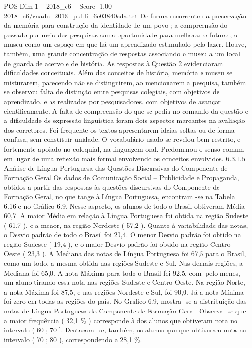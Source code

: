 \begin{textsample}{POS Dim 1 – 2018\_c6 – Score -1.00 – 2018\_c6/enade\_2018\_publi\_6e03840cda.txt}
De forma recorrente : a preservação da memória para construção da identidade de um povo ; a compreensão do passado por meio das pesquisas como oportunidade para melhorar o futuro ; o museu como um espaço em que há um aprendizado estimulado pelo lazer.
Houve, também, uma grande concentração de respostas associando o museu a um local de guarda de acervo e de história.
As respostas à Questão 2 evidenciaram dificuldades conceituais.
Além dos conceitos de história, memória e museu se misturarem, parecendo não se distinguirem, ao mencionarem a pesquisa, também se observou falta de distinção entre pesquisas colegiais, com objetivos de aprendizado, e as realizadas por pesquisadores, com objetivos de avançar cientificamente.
A falta de compreensão do que se pedia no comando da questão e a dificuldade de expressão linguística foram dois aspectos marcantes na avaliação dos corretores.
Foi frequente os textos apresentarem ideias soltas ou de forma confusa, sem constituir unidade.
O vocabulário usado se revelou bem restrito, e fortemente apoiado no coloquial, na linguagem oral.
Predominou o senso comum em lugar de uma reflexão mais formal envolvendo os conceitos envolvidos. 6.3.1.5 Análise de Língua Portuguesa das Questões Discursivas do Componente de Formação Geral Os dados de Comunicação Social – Publicidade e Propaganda, obtidos a partir das respostas às questões discursivas do Componente de Formação Geral, no que tange à Língua Portuguesa, encontram -se na Tabela 6.16 e no Gráfico 6.9.
Nesse aspecto, os alunos de todo o Brasil obtiveram Média 60,7.
A maior Média em relação à Língua Portuguesa foi obtida na região Sudeste ( 61,7 ), e a menor, na região Nordeste ( 57,2 ).
Quanto à variabilidade das notas, o Desvio padrão de todo o Brasil foi 20,4.
O menor Desvio padrão foi obtido na região Sudeste ( 19,4 ), e o maior Desvio padrão foi obtido na região Centro-Oeste ( 23,3 ).
A Mediana das notas de Língua Portuguesa foi 67,5 para o Brasil, como um todo, a mesma obtida nas regiões Sudeste e Sul.
Nas demais regiões, a Mediana foi 65,0.
A nota Máxima para todo o Brasil foi 92,5, com, pelo menos, um aluno tirando essa nota nas regiões Sudeste e Centro-Oeste.
Na região Norte, a nota Máxima foi 87,5, e nas regiões Nordeste e Sul, foi 90,0.
Já a nota Mínima foi zero em todas as regiões do país.
No Gráfico 6.9, mostra -se a distribuição das notas de Língua Portuguesa do Componente de Formação Geral.
Observa -se que a maior frequência ( 32,1 \% ) corresponde à dos alunos que obtiveram nota no intervalo ( 60 ; 70 ].
Destacam -se, também, os alunos que que obtiveram nota no intervalo ( 70 ; 80 ), correspondendo a 28,1 \%.

\end{textsample}

